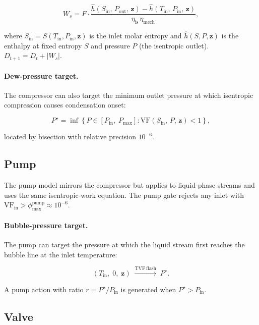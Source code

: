 \documentclass[11pt,a4paper]{article}
\theoremstyle{definition}
\theoremstyle{plain}
\newcommand{\abs}[1]{\left|#1\right|}
\begin{document}
\begin{equation}
 W_s = F \cdot \frac{\hat{h}(S_{\mathrm{in}},\,
  P_{\mathrm{out}},\, \bm{z}) - \hat{h}(T_{\mathrm{in}},\,
  P_{\mathrm{in}},\, \bm{z})}{\eta_{\mathrm{is}}\,
  \eta_{\mathrm{mech}}},
\end{equation}

where $S_{\mathrm{in}} = S(T_{\mathrm{in}}, P_{\mathrm{in}}, \bm{z})$ is the inlet molar entropy and $\hat{h}(S, P, \bm{z})$ is the enthalpy at fixed entropy $S$ and pressure $P$ (the isentropic outlet). $D_{t+1} = D_t + \abs{W_s}$.

\paragraph{Dew-pressure target.}
The compressor can also target the minimum outlet pressure at which isentropic compression causes condensation onset:

\begin{equation}
 P^\star = \inf\!\left\{P \in [P_{\mathrm{in}},\; P_{\max}]
 : \mathrm{VF}(S_{\mathrm{in}},\, P,\, \bm{z}) < 1\right\},
\end{equation}

located by bisection with relative precision $10^{-6}$.

\subsection{Pump}
\label{sec:pump}

The pump model mirrors the compressor but applies to liquid-phase streams and uses the same isentropic-work equation. The pump gate rejects any inlet with $\mathrm{VF}_{\mathrm{in}} > \phi_{\max}^{\mathrm{pump}} \approx 10^{-6}$.

\paragraph{Bubble-pressure target.}
The pump can target the pressure at which the liquid stream first reaches the bubble line at the inlet temperature:

\begin{equation}
 (T_{\mathrm{in}},\; 0,\; \bm{z})
 \;\xrightarrow{\mathrm{TVF\,flash}}\;
 P^\star.
\end{equation}

A pump action with ratio $r = P^\star / P_{\mathrm{in}}$ is generated when $P^\star > P_{\mathrm{in}}$.

\subsection{Valve}
\label{sec:valve}
\end{document}
